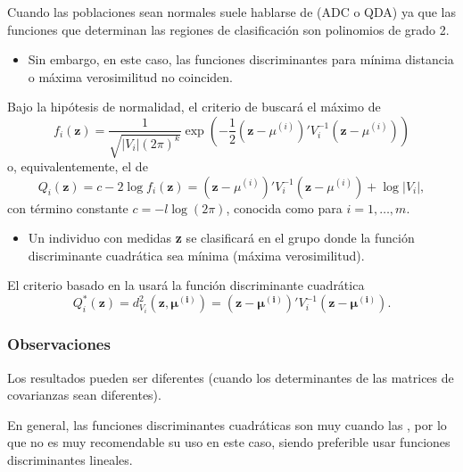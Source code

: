 Cuando las poblaciones sean normales suele hablarse de  (ADC o QDA) ya que las funciones que determinan las regiones de clasificación son polinomios de grado 2.
\begin{itemize}
\item Sin embargo, en este caso, las funciones discriminantes para mínima distancia o máxima verosimilitud no coinciden.
\end{itemize}
Bajo la hipótesis de normalidad, el criterio de  buscará el máximo de \[ f_i(\mathbf{z})=\dfrac{1}{\sqrt{|V_i|(2\pi)^k}}\exp\left(-\dfrac{1}{2}(\mathbf{z}-\mu^{(i)})'V_i^{-1}(\mathbf{z}-\mu^{(i)})\right) \]o, equivalentemente, el  de \[ Q_i(\mathbf{z})=c-2\log f_i(\mathbf{z})=(\mathbf{z}-\mu^{(i)})'V_i^{-1}(\mathbf{z}-\mu^{(i)})+\log|V_i|, \]con término constante $c=-l\log(2\pi)$, conocida como  para $i=1,\dots,m$.
\begin{itemize}
\item Un individuo con medidas \textbf{z} se clasificará en el grupo donde la función discriminante cuadrática sea mínima (máxima verosimilitud).
\end{itemize}
El criterio basado en la  usará la función discriminante cuadrática \[ Q_i^*(\mathbf{z})=d_{V_i}^2(\mathbf{z,\mu^{(i)}})=(\mathbf{z-\mu^{(i)}})'V_i^{-1}(\mathbf{z-\mu^{(i)}}). \]
\subsubsection{Observaciones}
Los resultados pueden ser diferentes (cuando los determinantes de las matrices de covarianzas sean diferentes).

En general, las funciones discriminantes cuadráticas son muy  cuando las , por lo que no es muy recomendable su uso en este caso, siendo preferible usar funciones discriminantes lineales.

\Ej

